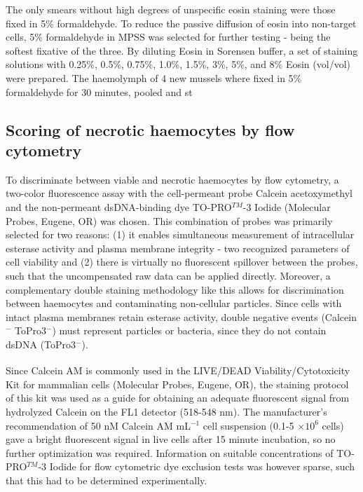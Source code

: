 The only smears without high degrees of unspecific eosin staining were those fixed in 5\% formaldehyde. To reduce the passive diffusion of eosin into non-target cells, 5\% formaldehyde in MPSS was selected for further testing - being the softest fixative of the three. By diluting Eosin in Sorensen buffer, a set of staining solutions with 0.25\%, 0.5\%, 0.75\%, 1.0\%, 1.5\%, 3\%, 5\%, and 8\% Eosin (vol/vol) were prepared. The haemolymph of 4 new mussels where fixed in 5\% formaldehyde for 30 minutes, pooled and st  

\subsection{Scoring of necrotic haemocytes by flow cytometry}
To discriminate between viable and necrotic haemocytes by flow cytometry, a two-color fluorescence assay with the cell-permeant probe Calcein acetoxymethyl and the non-permeant dsDNA-binding dye TO-PRO$^{TM}$-3 Iodide (Molecular Probes, Eugene, OR) was chosen. This combination of probes was primarily selected for two reasons: (1) it enables simultaneous measurement of intracellular esterase activity and plasma membrane integrity - two recognized parameters of cell viability and (2) there is virtually no fluorescent spillover between the probes, such that the uncompensated raw data can be applied directly. Moreover, a complementary double staining methodology like this allows for discrimination between haemocytes and contaminating non-cellular particles. Since cells with intact plasma membranes retain esterase activity, double negative events (Calcein$^{-}$ ToPro3$^{-}$) must represent particles or bacteria, since they do not contain dsDNA (ToPro3$^{-}$). 

Since Calcein AM is commonly used in the LIVE/DEAD\textsuperscript{\textregistered} Viability/Cytotoxicity Kit for mammalian cells (Molecular Probes, Eugene, OR), the staining protocol of this kit was used as a guide for obtaining an adequate fluorescent signal from hydrolyzed Calcein on the FL1 detector (518-548 nm). The manufacturer's recommendation of 50 nM Calcein AM mL$^{-1}$ cell suspension (0.1-5 $\times 10^{6}$ cells) gave a bright fluorescent signal in live cells after 15 minute incubation, so no further optimization was required. Information on suitable concentrations of TO-PRO$^{TM}$-3 Iodide for flow cytometric dye exclusion tests was however sparse, such that this had to be determined experimentally.


